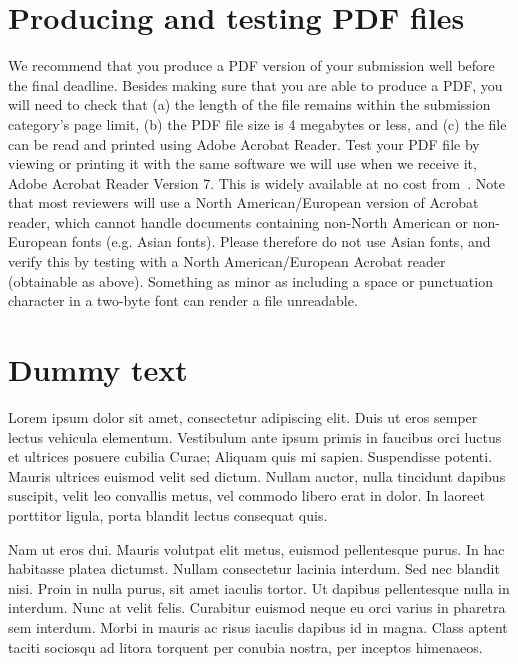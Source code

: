 \documentclass{chi-ext}
\begin{document}
\section{Producing and testing PDF files}
We recommend that you produce a PDF version of your submission well before the final deadline. 
Besides making sure that you are able to produce a PDF, you will need to check that (a) the length of the file remains within the submission category's page limit, (b) the PDF file size is 4 megabytes or less, and (c) the file can be read and printed using Adobe Acrobat Reader. 
Test your PDF file by viewing or printing it with the same software we will use when we receive it, Adobe Acrobat Reader Version 7. 
This is widely available at no cost from~\cite{Acrobat7}.  
Note that most reviewers will use a North American/European version of Acrobat reader, which cannot handle documents containing non-North American or non-European fonts (e.g. Asian fonts).  
Please therefore do not use Asian fonts, and verify this by testing with a North American/European Acrobat reader (obtainable as above). Something as minor as including a space or punctuation character in a two-byte font can render a file unreadable.


\section{Dummy text}
Lorem ipsum dolor sit amet, consectetur adipiscing elit. Duis ut eros semper lectus vehicula elementum. Vestibulum ante ipsum primis in faucibus orci luctus et ultrices posuere cubilia Curae; Aliquam quis mi sapien. Suspendisse potenti. Mauris ultrices euismod velit sed dictum. Nullam auctor, nulla tincidunt dapibus suscipit, velit leo convallis metus, vel commodo libero erat in dolor. In laoreet porttitor ligula, porta blandit lectus consequat quis. 

Nam ut eros dui. Mauris volutpat elit metus, euismod pellentesque purus. In hac habitasse platea dictumst. Nullam consectetur lacinia interdum. Sed nec blandit nisi. Proin in nulla purus, sit amet iaculis tortor. Ut dapibus pellentesque nulla in interdum. Nunc at velit felis. Curabitur euismod neque eu orci varius in pharetra sem interdum. Morbi in mauris ac risus iaculis dapibus id in magna. Class aptent taciti sociosqu ad litora torquent per conubia nostra, per inceptos himenaeos.
\end{document}
